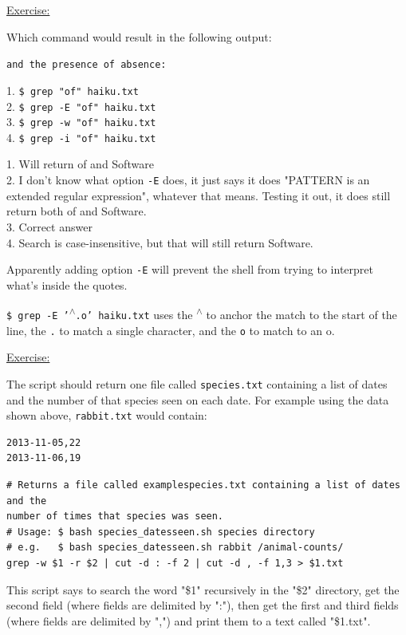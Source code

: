 \documentclass[12pt]{article}
\begin{document}
\begin{addmargin}[1cm]{0cm}
\color{gray}
\underline{Exercise:}

Which command would result in the following output: 

\texttt{and the presence of absence:}

1. \texttt{\$ grep "of" haiku.txt}
\\2. \texttt{\$ grep -E "of" haiku.txt}
\\3. \texttt{\$ grep -w "of" haiku.txt}
\\4. \texttt{\$ grep -i "of" haiku.txt}

\color{black}\vspace{0.5em}
1. Will return of and Software
\\2. I don't know what option \texttt{-E} does, it just says it does "PATTERN is an extended regular expression", whatever that means. Testing it out, it does still return both of and Software.
\\3. Correct answer
\\4. Search is case-insensitive, but that will still return Software.\end{addmargin}

Apparently adding option \texttt{-E} will prevent the shell from trying to interpret what's inside the quotes.

\texttt{\$ grep -E '\textsuperscript{$\wedge$}.o' haiku.txt} uses the \textsuperscript{$\wedge$} to anchor the match to the start of the line, the \texttt{.} to match a single character, and the \texttt{o} to match to an o.

\newpage \begin{addmargin}[1cm]{0cm}
\color{gray}
\underline{Exercise:}

The script should return one file called \texttt{species.txt} containing a list of dates and the number of that species seen on each date. For example using the data shown above, \texttt{rabbit.txt} would contain:

\vspace{-0.5em}\begin{verbatim}
2013-11-05,22
2013-11-06,19
\end{verbatim}\vspace{-0.5em}

\color{black}\vspace{-0.5em}
\begin{verbatim}
# Returns a file called examplespecies.txt containing a list of dates and the 
number of times that species was seen.
# Usage: $ bash species_datesseen.sh species directory 
# e.g.   $ bash species_datesseen.sh rabbit /animal-counts/
grep -w $1 -r $2 | cut -d : -f 2 | cut -d , -f 1,3 > $1.txt
\end{verbatim}
This script says to search the word "\$1" recursively in the "\$2" directory, get the second field (where fields are delimited by ":"), then get the first and third fields (where fields are delimited by ",") and print them to a text called "\$1.txt".
\end{addmargin}
\end{document}

